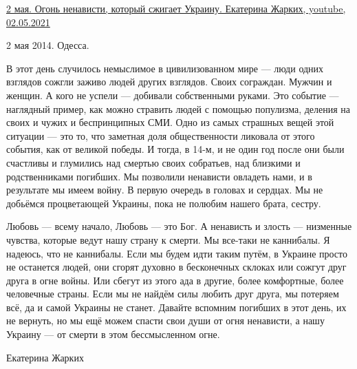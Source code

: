  
 
 
 
 

\href{https://youtu.be/50UdMGoAouQ}{%
2 мая. Огонь ненависти, который сжигает Украину. Екатерина Жарких, youtube, 02.05.2021%
}

\begin{multicols}{2}
2 мая 2014. Одесса. 

В этот день случилось немыслимое в цивилизованном мире — люди одних взглядов
сожгли заживо людей других взглядов. Своих сограждан. Мужчин и женщин. А кого
не успели — добивали собственными руками. Это событие — наглядный пример, как
можно стравить людей с помощью популизма, деления на своих и чужих и
беспринципных СМИ. Одно из самых страшных вещей этой ситуации — это то, что
заметная доля общественности ликовала от этого события, как от великой победы.
И тогда, в 14-м, и не один год после они были счастливы и глумились над смертью
своих собратьев, над близкими и родственниками погибших. Мы позволили ненависти
овладеть нами, и в результате мы имеем войну. В первую очередь в головах и
сердцах. Мы не добьёмся процветающей Украины, пока не полюбим нашего брата,
сестру. 

Любовь — всему начало, Любовь — это Бог. А ненависть и злость — низменные
чувства, которые ведут нашу страну к смерти. Мы все-таки не каннибалы. Я
надеюсь, что не каннибалы. Если мы будем идти таким путём, в Украине просто не
останется людей, они сгорят духовно в бесконечных склоках или сожгут друг друга
в огне войны. Или сбегут из этого ада в другие, более комфортные, более
человечные страны. Если мы не найдём силы любить друг друга, мы потеряем всё,
да и самой Украины не станет. Давайте вспомним погибших в этот день, их не
вернуть, но мы ещё можем спасти свои души от огня ненависти, а нашу Украину —
от смерти в этом бессмысленном огне. 

Екатерина Жарких
\end{multicols}


